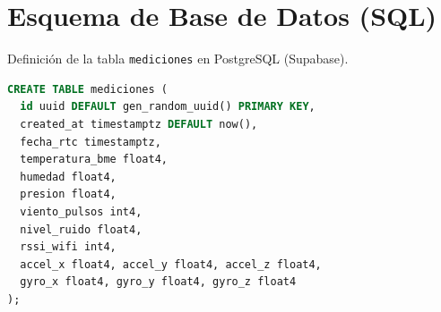 \section{Esquema de Base de Datos (SQL)}
Definición de la tabla \texttt{mediciones} en PostgreSQL (Supabase).

\begin{lstlisting}[language=SQL]
CREATE TABLE mediciones (
  id uuid DEFAULT gen_random_uuid() PRIMARY KEY,
  created_at timestamptz DEFAULT now(),
  fecha_rtc timestamptz,
  temperatura_bme float4,
  humedad float4,
  presion float4,
  viento_pulsos int4,
  nivel_ruido float4,
  rssi_wifi int4,
  accel_x float4, accel_y float4, accel_z float4,
  gyro_x float4, gyro_y float4, gyro_z float4
);
\end{lstlisting}
